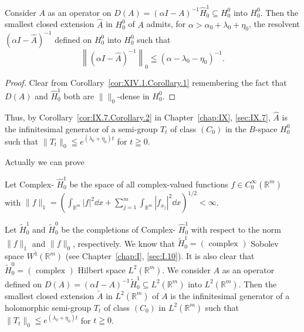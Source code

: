 \begin{corollary}\label{cor:XIV.1.Corollary.2} Consider $A$ as an operator on $D(A) = (\alpha I - A)^{-1} \hat{H}_0^1 \subseteq H_0^0$ into $H_0^0$. Then the smallest closed extension $\hat{A}$ in $H_0^0$ of $A$ admits, for $\alpha > \hat{\alpha}_0 + \lambda_0 + \eta_0$, the resolvent $(\alpha I - \hat{A})^{-1}$ defined on $H_0^0$ into $H_0^0$ such that 
\begin{equation}\label{eq:XIV.1.19}
\left\| (\alpha I - \hat {A}) ^{-1} \right\| _{0} \leqq (\alpha - \lambda_{0} - \eta_{0}) ^{-1}.
\end{equation}
\end{corollary}

\begin{proof}
 Clear from Corollary~\ref{cor:XIV.1.Corollary.1} remembering the fact that $D(A)$ and $\hat{H}_0^1$ both are $\|\|_0$-dense in $H_0^0$. 
\end{proof}

Thus, by Corollary~\ref{cor:IX.7.Corollary.2} in Chapter~\ref{chap:IX}, \ref{sec:IX.7}, $\hat{A}$ is the infinitesimal generator of a semi-group $T_{t}$ of class $(C_0)$ in the $B$-space $H_0^0$ such that $\| T_t \|_0 \leqq e^{(\lambda_0+ \eta_0)t}$ for $t \geqq 0$. 

Actually we can prove 

\begin{theorem}\label{thm:XIV.1.Theorem.1} Let Complex- $\hat{H}_0^1$ be the space of all complex-valued functions $f \in C_0^\infty(\mathbb{R}^{m})$ with $\|f\|_1 = \left( \int_{\mathbb{R}^{m}} |f|^2 \dd x + \sum\limits_{j=1}^{m} \int_{\mathbb{R}^{m}} |f_{x_{j}}|^2 \dd x \right)^{1/2} < \infty$. 
\end{theorem}

Let $\tilde{H}_0^1$ and $\tilde{H}_0^0$ be the completions of Complex- $\hat{H}_0^1$ with respect to the norm $\|f\|_1$ and $\|f\|_0$, respectively. We know that $\tilde{H}_0^1 = (\text{ complex })$ Sobolev space $W^1(\mathbb{R}^{m})$ (see Chapter~\ref{chap:I}, \ref{sec:I.10}). It is also clear that $\tilde{H}_0^0 = (\text{ complex })$ Hilbert space $L^2(\mathbb{R}^{m})$. We consider $A$ as an operator defined on $D(A) = (\alpha I - A)^{-1}\tilde{H}_0^1 \subseteq L^2(\mathbb{R}^{m})$ into $L^2(\mathbb{R}^{m})$. Then the smallest closed extension $\tilde{A}$ in $L^2(\mathbb{R}^{m})$ of $A$ is the infinitesimal generator of a holomorphic semi-group $T_t$ of class $(C_0)$ in $L^2(\mathbb{R}^{m})$ such that $\|T_t\|_0 \leqq e^{(\lambda_0+ \eta_0)t}$ for $t \geqq 0$. 


